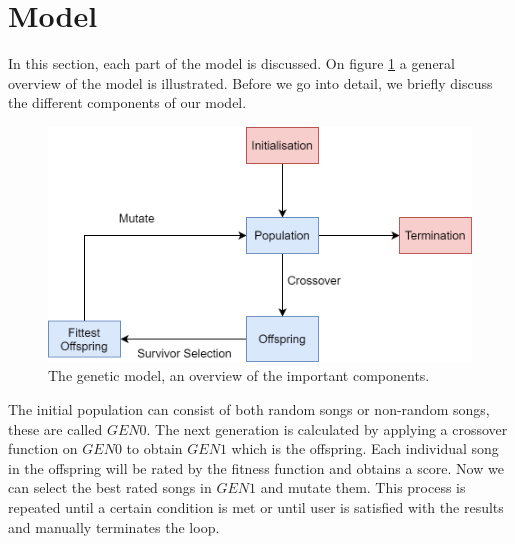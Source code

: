 \section{Model}
In this section, each part of the model is discussed. On figure \ref{fig:GA_MODEL} a general overview of the model is illustrated. Before we go into detail, we briefly discuss the different components of our model.
\begin{figure}
    \includegraphics[width=\linewidth]{figures/GA_structure.png}
    \caption{The genetic model, an overview of the important components.}
    \label{fig:GA_MODEL}
\end{figure}

The initial population can consist of both random songs or non-random songs, these are called $GEN0$. The next generation is calculated by applying a crossover function on $GEN0$ to obtain $GEN1$ which is the offspring. Each individual song in the offspring will be rated by the fitness function and obtains a score. Now we can select the best rated songs in $GEN1$ and mutate them. This process is repeated until a certain condition is met or until user is satisfied with the results and manually terminates the loop.





